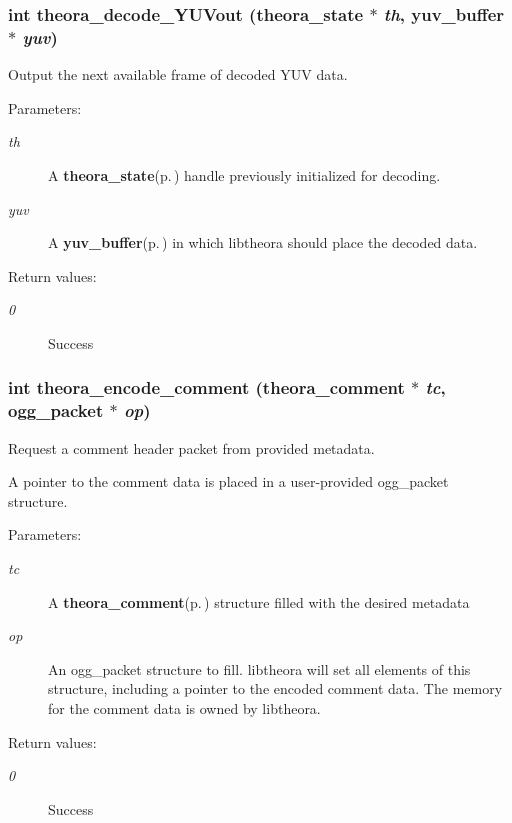 \subsubsection{\setlength{\rightskip}{0pt plus 5cm}int theora\_\-decode\_\-YUVout ({\bf theora\_\-state} $\ast$ {\em th}, {\bf yuv\_\-buffer} $\ast$ {\em yuv})}\label{theora_8h_a24}


Output the next available frame of decoded YUV data. 

\begin{Desc}
\item[Parameters:]
\begin{description}
\item[{\em th}]A {\bf theora\_\-state}{\rm (p.\,\pageref{structtheora__state})} handle previously initialized for decoding. \item[{\em yuv}]A {\bf yuv\_\-buffer}{\rm (p.\,\pageref{structyuv__buffer})} in which libtheora should place the decoded data. \end{description}
\end{Desc}
\begin{Desc}
\item[Return values:]
\begin{description}
\item[{\em 0}]Success \end{description}
\end{Desc}
\subsubsection{\setlength{\rightskip}{0pt plus 5cm}int theora\_\-encode\_\-comment ({\bf theora\_\-comment} $\ast$ {\em tc}, ogg\_\-packet $\ast$ {\em op})}\label{theora_8h_a19}


Request a comment header packet from provided metadata. 

A pointer to the comment data is placed in a user-provided ogg\_\-packet structure. \begin{Desc}
\item[Parameters:]
\begin{description}
\item[{\em tc}]A {\bf theora\_\-comment}{\rm (p.\,\pageref{structtheora__comment})} structure filled with the desired metadata \item[{\em op}]An ogg\_\-packet structure to fill. libtheora will set all elements of this structure, including a pointer to the encoded comment data. The memory for the comment data is owned by libtheora. \end{description}
\end{Desc}
\begin{Desc}
\item[Return values:]
\begin{description}
\item[{\em 0}]Success \end{description}
\end{Desc}
